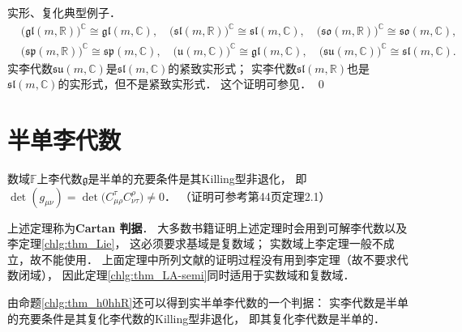 \begin{example}\label{chlg:exam_real-complex}
    实形、复化典型例子．
    \begin{align*}
        &\bigl(\mathfrak{gl}(m,\mathbb{R}) \bigr)^{\mathbb{C}} \cong \mathfrak{gl}(m,\mathbb{C}), \quad
        \bigl(\mathfrak{sl}(m,\mathbb{R}) \bigr)^{\mathbb{C}} \cong \mathfrak{sl}(m,\mathbb{C}), \quad
        \bigl(\mathfrak{so}(m,\mathbb{R}) \bigr)^{\mathbb{C}} \cong \mathfrak{so}(m,\mathbb{C}), \\
        &\bigl(\mathfrak{sp}(m,\mathbb{R}) \bigr)^{\mathbb{C}} \cong \mathfrak{sp}(m,\mathbb{C}), \quad
        \bigl(\mathfrak{u}(m,\mathbb{C}) \bigr)^{\mathbb{C}} \cong \mathfrak{gl}(m,\mathbb{C}), \quad
        \bigl(\mathfrak{su}(m,\mathbb{C}) \bigr)^{\mathbb{C}} \cong \mathfrak{sl}(m,\mathbb{C}).
    \end{align*}
    实李代数$\mathfrak{su}(m,\mathbb{C})$是$\mathfrak{sl}(m,\mathbb{C})$的紧致实形式；
    实李代数$\mathfrak{sl}(m,\mathbb{R})$也是$\mathfrak{sl}(m,\mathbb{C})$的实形式，但不是紧致实形式．
    这个证明可参见\parencite[p.266]{wanzx-2013}． \qed
\end{example}




\section{半单李代数}





\begin{theorem}\label{chlg:thm_LA-semi}
    数域$\mathbb{F}$上李代数$\mathfrak{g}$是半单的充要条件是其Killing型非退化，
    即$\det(g_{\mu\nu}) =\det\bigl( C^\tau_{\mu\rho} C^\rho_{\nu\tau}\bigr) \neq 0$．
    （证明可参考\parencite[\S 6.2]{serre-1992}第44页定理2.1）
\end{theorem}


上述定理称为{\heiti \bfseries Cartan 判据}．
大多数书籍证明上述定理时会用到可解李代数以及李定理\ref{chlg:thm_Lie}，
这必须要求基域是复数域；
实数域上李定理一般不成立，故不能使用．
上面定理中所列文献的证明过程没有用到李定理（故不要求代数闭域），
因此定理\ref{chlg:thm_LA-semi}同时适用于实数域和复数域．

由命题\ref{chlg:thm_h0hhR}还可以得到实半单李代数的一个判据：
实李代数是半单的充要条件是其复化李代数的Killing型非退化，
即其复化李代数是半单的．


